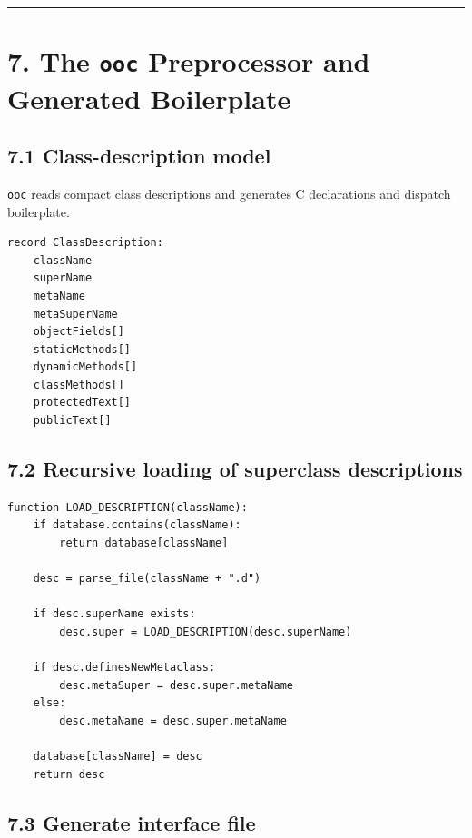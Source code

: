 \documentclass[11pt]{article}
\begin{document}
\begin{center}\rule{0.5\linewidth}{0.5pt}\end{center}

\section{\texorpdfstring{7. The \texttt{ooc} Preprocessor and Generated
Boilerplate}{7. The ooc Preprocessor and Generated Boilerplate}}\label{the-ooc-preprocessor-and-generated-boilerplate}

\subsection{7.1 Class-description model}\label{class-description-model}

\texttt{ooc} reads compact class descriptions and
generates C declarations and dispatch boilerplate.

\begin{verbatim}
record ClassDescription:
    className
    superName
    metaName
    metaSuperName
    objectFields[]
    staticMethods[]
    dynamicMethods[]
    classMethods[]
    protectedText[]
    publicText[]
\end{verbatim}

\subsection{7.2 Recursive loading of superclass
descriptions}\label{recursive-loading-of-superclass-descriptions}

\begin{verbatim}
function LOAD_DESCRIPTION(className):
    if database.contains(className):
        return database[className]

    desc = parse_file(className + ".d")

    if desc.superName exists:
        desc.super = LOAD_DESCRIPTION(desc.superName)

    if desc.definesNewMetaclass:
        desc.metaSuper = desc.super.metaName
    else:
        desc.metaName = desc.super.metaName

    database[className] = desc
    return desc
\end{verbatim}

\subsection{7.3 Generate interface file}\label{generate-interface-file}
\end{document}
